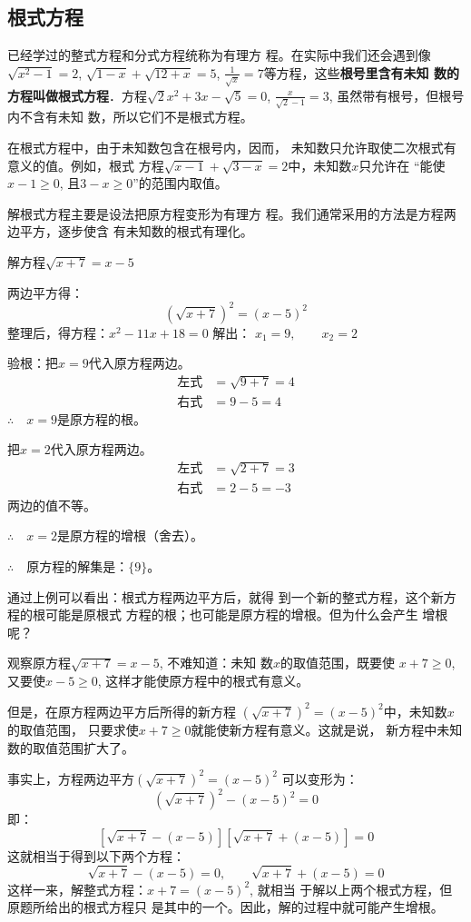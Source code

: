 \subsection{根式方程}
已经学过的整式方程和分式方程统称为有理方
程。在实际中我们还会遇到像$\sqrt{x^2-1}=2$, $\sqrt{1-x}+\sqrt{12+x}=5$,
$\frac{1}{\sqrt{x}}=7$等方程，这些\textbf{根号里含有未知
数的方程叫做根式方程}．方程$\sqrt{2}x^2+3x-\sqrt{5}=0$, 
$\frac{x}{\sqrt{2}-1}=3$, 虽然带有根号，但根号内不含有未知
数，所以它们不是根式方程。

在根式方程中，由于未知数包含在根号内，因而，
未知数只允许取使二次根式有意义的值。例如，根式
方程$\sqrt{x-1}+\sqrt{3-x}=2$中，未知数$x$只允许在
“能使$x-1\ge 0$, 且$3-x\ge 0$”的范围内取值。

解根式方程主要是设法把原方程变形为有理方
程。我们通常采用的方法是方程两边平方，逐步使含
有未知数的根式有理化。





\begin{example}
解方程$\sqrt{x+7}=x-5$
\end{example}

\begin{solution}
    两边平方得：
    \[(\sqrt{x+7})^2=(x-5)^2\]
    整理后，得方程：$x^2-11x+18=0$
    解出：
    $x_1=9,\qquad x_2=2$

    验根：把$x=9$代入原方程两边。
    \[\begin{split}
        \text{左式}&=\sqrt{9+7}=4\\
        \text{右式}&=9-5=4      
    \end{split}\]
$\therefore\quad x=9$是原方程的根。
    
把$x=2$代入原方程两边。
\[\begin{split}
    \text{左式}&=\sqrt{2+7}=3\\
    \text{右式}&=2-5=-3      
\end{split}\]
两边的值不等。

$\therefore\quad x=2$是原方程的增根（舍去）。

$\therefore\quad $原方程的解集是：$\{9\}$。

通过上例可以看出：根式方程两边平方后，就得
到一个新的整式方程，这个新方程的根可能是原根式
方程的根；也可能是原方程的增根。但为什么会产生
增根呢？

观察原方程$\sqrt{x+7}=x-5$, 不难知道：未知
数$x$的取值范围，既要使
$x+7\ge 0$, 又要使$x-5
\ge 0$, 这样才能使原方程中的根式有意义。

但是，在原方程两边平方后所得的新方程
$(\sqrt{x+7})^2=(x-5)^2$中，未知数$x$的取值范围，
只要求使$x+7\ge 0$就能使新方程有意义。这就是说，
新方程中未知数的取值范围扩大了。

事实上，方程两边平方$(\sqrt{x+7})^2=(x-5)^2$
可以变形为：
\[(\sqrt{x+7})^2-(x-5)^2=0\]
即：
\[\left[\sqrt{x+7}-(x-5)\right]\left[\sqrt{x+7}+(x-5)\right]=0 \]
这就相当于得到以下两个方程：
\[\sqrt{x+7}-(x-5)=0,\qquad \sqrt{x+7}+(x-5)=0\]
这样一来，解整式方程：$x+7=(x-5)^2$, 就相当
于解以上两个根式方程，但原题所给出的根式方程只
是其中的一个。因此，解的过程中就可能产生增根。
\end{solution}

